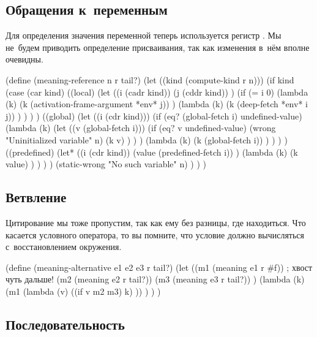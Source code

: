 \subsection{Обращения к~переменным}\label{fast/reject/ssect:ref}

Для определения значения переменной теперь используется регистр . Мы
не~будем приводить определение присваивания, так как изменения в~нём вполне
очевидны.

\begin{code:lisp}
(define (meaning-reference n r tail?)
  (let ((kind (compute-kind r n)))
    (if kind
        (case (car kind)
          ((local)
           (let ((i (cadr kind))
                 (j (cddr kind)) )
             (if (= i 0)
                 (lambda (k)
                   (k (activation-frame-argument *env* j)) )
                 (lambda (k)
                   (k (deep-fetch *env* i j)) ) ) ) )
          ((global)
           (let ((i (cdr kind)))
             (if (eq? (global-fetch i) undefined-value)
                 (lambda (k)
                   (let ((v (global-fetch i)))
                     (if (eq? v undefined-value)
                         (wrong "Uninitialized variable" n)
                         (k v) ) ) )
                 (lambda (k)
                   (k (global-fetch i)) ) ) ) )
          ((predefined)
           (let* ((i (cdr kind))
                  (value (predefined-fetch i)) )
             (lambda (k)
               (k value) ) ) ) )
        (static-wrong "No such variable" n) ) ) )
\end{code:lisp}


\subsection{Ветвление}\label{fast/reject/ssect:alternatives}

Цитирование мы тоже пропустим, так как ему без разницы, где находиться. Что
касается условного оператора, то вы помните, что условие должно вычисляться
с~восстановлением окружения.

\begin{code:lisp}
(define (meaning-alternative e1 e2 e3 r tail?)
  (let ((m1 (meaning e1 r #f))        ; хвост чуть дальше!
        (m2 (meaning e2 r tail?))
        (m3 (meaning e3 r tail?)) )
    (lambda (k)
      (m1 (lambda (v)
            ((if v m2 m3) k) )) ) ) )
\end{code:lisp}


\subsection{Последовательность}\label{fast/reject/ssect:sequence}

